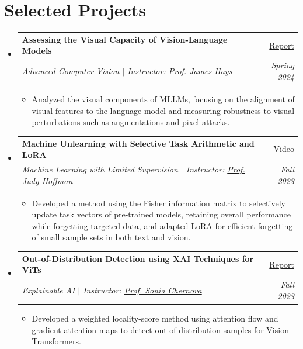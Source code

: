 \documentclass[letterpaper,11pt]{article}
\makeatletter
\newcommand{\resumeItem}[1]{
  \item\small{
    {#1 \vspace{-2pt}}
  }
}
\newcommand{\resumeSubheading}[4]{
  \vspace{-2pt}\item
    \begin{tabular*}{0.97\textwidth}[t]{l@{\extracolsep{\fill}}r}
      \textbf{#1} & #2 \\
      \textit{\small#3} & \textit{\small #4} \\
    \end{tabular*}\vspace{-7pt}
}
\newcommand{\resumeSubHeadingListStart}{\begin{itemize}[leftmargin=0.15in, label={}]}
\newcommand{\resumeSubHeadingListEnd}{\end{itemize}}
\newcommand{\resumeItemListStart}{\begin{itemize}}
\newcommand{\resumeItemListEnd}{\end{itemize}\vspace{-5pt}}
\makeatother
\begin{document}
\section{Selected Projects}
\resumeSubHeadingListStart

\resumeSubheading
  {Assessing the Visual Capacity of Vision-Language Models}{\href{https://drive.google.com/file/d/1HMdkUYNzpSa0BWXzgzivMYy7QCaX03Ij/view?usp=sharing}{Report}}
  {Advanced Computer Vision $|$ Instructor: \href{https://faculty.cc.gatech.edu/~hays/}{Prof. James Hays}}{Spring 2024}
  \resumeItemListStart
    \resumeItem{Analyzed the visual components of MLLMs, focusing on the alignment of visual features to the language model and measuring robustness to visual perturbations such as augmentations and pixel attacks.}
  \resumeItemListEnd

\resumeSubheading
  {Machine Unlearning with Selective Task Arithmetic and LoRA}{\href{https://www.youtube.com/watch?v=I7czqbN_k90}{Video}}
  {Machine Learning with Limited Supervision $|$ Instructor: \href{https://faculty.cc.gatech.edu/~judy/}{Prof. Judy Hoffman}}{Fall 2023}
  \resumeItemListStart
    \resumeItem{Developed a method using the Fisher information matrix to selectively update task vectors of pre-trained models, retaining overall performance while forgetting targeted data, and adapted LoRA for efficient forgetting of small sample sets in both text and vision.}
  \resumeItemListEnd

\resumeSubheading
  {Out-of-Distribution Detection using XAI Techniques for ViTs}{\href{https://drive.google.com/file/d/1pD-prxcAQAS9vdKYo1tovT_I8l9nD5WT/view?usp=sharing}{Report}}
  {Explainable AI $|$ Instructor: \href{https://faculty.cc.gatech.edu/~chernova/}{Prof. Sonia Chernova}}{Fall 2023}
  \resumeItemListStart
    \resumeItem{Developed a weighted locality-score method using attention flow and gradient attention maps to detect out-of-distribution samples for Vision Transformers.}
  \resumeItemListEnd

\resumeSubHeadingListEnd
\end{document}
